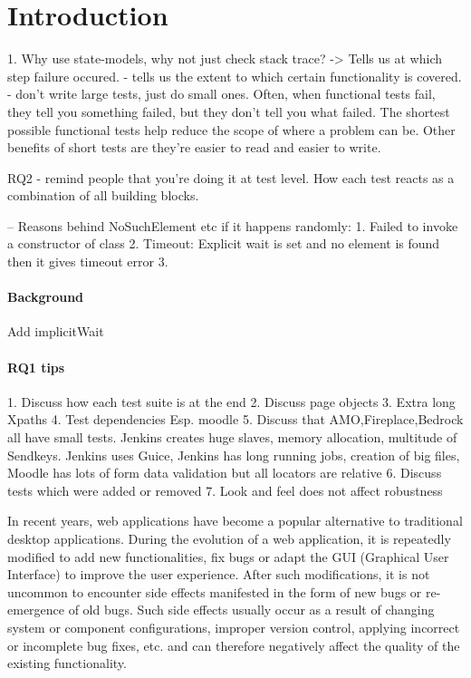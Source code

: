 \chapter{Introduction} %


\label{Chapter1} %



1. Why use state-models, why not just check stack trace? 
-> Tells us at which step failure occured. 
- tells us the extent to which certain functionality is covered. 
- don't write large tests, just do small ones. Often, when functional tests fail, they tell you something failed, but they don't tell you what failed. The shortest possible functional tests help reduce the scope of where a problem can be. Other benefits of short tests are they're easier to read and easier to write.

RQ2 - remind people that you're doing it at test level. How each test reacts as a combination of all building blocks.

-- Reasons behind NoSuchElement etc if it happens randomly: 
1. Failed to invoke a constructor of class 
2. Timeout: Explicit wait is set and no element is found then it gives timeout error
3. 

\subsubsection*{Background}
Add implicitWait
\subsubsection*{RQ1 tips}
1. Discuss how each test suite is at the end
2. Discuss page objects
3. Extra long Xpaths
4. Test dependencies Esp. moodle
5. Discuss that AMO,Fireplace,Bedrock all have small tests. Jenkins creates huge slaves, memory allocation, multitude of Sendkeys. Jenkins uses Guice, Jenkins has long running jobs, creation of big files, Moodle has lots of form data validation but all locators are relative 
6. Discuss tests which were added or removed 
7. Look and feel does not affect robustness 


\newpage
In recent years, web applications have become a popular alternative to traditional desktop applications.
During the evolution of a web application, it is repeatedly modified to add new functionalities, fix bugs or adapt the GUI (Graphical User Interface) to improve the user experience. After such modifications, it is not uncommon to encounter side effects manifested in the form of new bugs or re-emergence of old bugs. Such side effects usually occur as a result of changing system or component configurations, improper version control, applying incorrect or incomplete bug fixes, etc. and can therefore negatively affect the quality of the existing functionality. 

